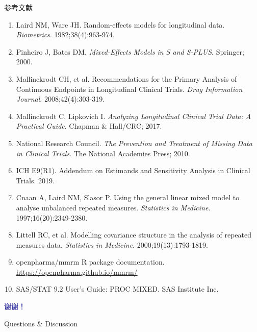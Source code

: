 \documentclass[aspectratio=169,11pt]{beamer}
\begin{document}
\begin{frame}{参考文献}
\small
\begin{enumerate}
    \item Laird NM, Ware JH. Random-effects models for longitudinal data. \textit{Biometrics}. 1982;38(4):963-974.
    \item Pinheiro J, Bates DM. \textit{Mixed-Effects Models in S and S-PLUS}. Springer; 2000.
    \item Mallinckrodt CH, et al. Recommendations for the Primary Analysis of Continuous Endpoints in Longitudinal Clinical Trials. \textit{Drug Information Journal}. 2008;42(4):303-319.
    \item Mallinckrodt C, Lipkovich I. \textit{Analyzing Longitudinal Clinical Trial Data: A Practical Guide}. Chapman \& Hall/CRC; 2017.
    \item National Research Council. \textit{The Prevention and Treatment of Missing Data in Clinical Trials}. The National Academies Press; 2010.
    \item ICH E9(R1). Addendum on Estimands and Sensitivity Analysis in Clinical Trials. 2019.
    \item Cnaan A, Laird NM, Slasor P. Using the general linear mixed model to analyse unbalanced repeated measures. \textit{Statistics in Medicine}. 1997;16(20):2349-2380.
    \item Littell RC, et al. Modelling covariance structure in the analysis of repeated measures data. \textit{Statistics in Medicine}. 2000;19(13):1793-1819.
    \item openpharma/mmrm R package documentation. \url{https://openpharma.github.io/mmrm/}
    \item SAS/STAT 9.2 User's Guide: PROC MIXED. SAS Institute Inc.
\end{enumerate}
\end{frame}

\begin{frame}[plain]
\begin{center}
\vspace{2cm}
{\Huge \textcolor{darkblue}{谢谢！}}

\vspace{1cm}
{\Large Questions \& Discussion}



\end{center}
\end{frame}
\end{document}
